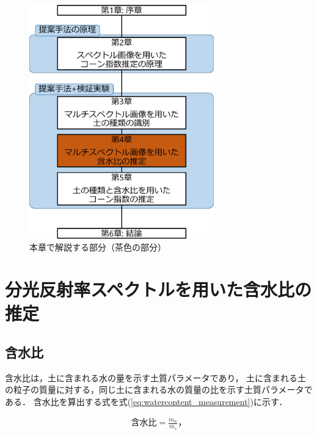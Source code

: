 \begin{figure}[p]
	\begin{center}
	\centering
	\includegraphics[width=8cm]{./Ch4_WaterContentEstimation/Fig/thesis_constitution_ch4_compressed.pdf}
	\caption{本章で解説する部分（茶色の部分）}\label{fig:thesis_constitution_ch4}
	\end{center}
\end{figure}

\clearpage

\section{分光反射率スペクトルを用いた含水比の推定}
\label{sec:EstimationFromSpectrum}

\subsection{含水比}
\label{ssec:WaterContent}

含水比は，土に含まれる水の量を示す土質パラメータであり，
土に含まれる土の粒子の質量に対する，同じ土に含まれる水の質量の比を示す土質パラメータである．
含水比を算出する式を\mbox{式(\ref{eq:watercontent_measurement})}に示す\cite{日本建設総合試験所2019}．

\begin{eqnarray}
含水比 = \frac{m_w}{m_s}， \label{eq:watercontent_measurement}
\end{eqnarray}

